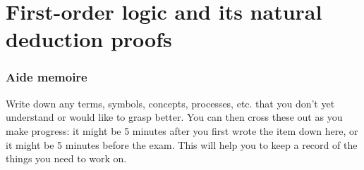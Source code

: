 \documentclass[a4paper]{article}
\theoremstyle{definition}
\begin{document}


\part{First-order logic and its natural deduction
  proofs}
\setcounter{section}{0}



\newpage
\thispagestyle{empty}

\section*{Aide memoire}

\noindent
Write down any terms, symbols, concepts, processes, etc. that
you don't yet understand or would like to grasp better.
You can then cross these out as you make progress:
it might be 5 minutes after you first wrote the
item down here, or it might be 5 minutes before the exam.
This will help you to keep a record of the things you
need to work on. \\[0.5em]
\end{document}
